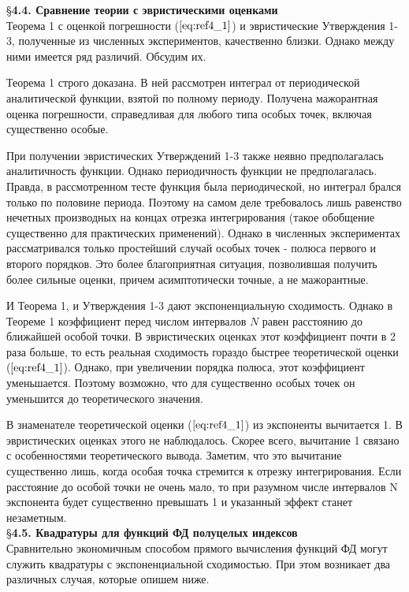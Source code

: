\S \textbf{4.4. Сравнение теории с эвристическими оценками}
\\

Теорема 1 с оценкой погрешности ($\ref{eq:ref4_1}$) и эвристические Утверждения 1-3, полученные из численных экспериментов, качественно близки. Однако между ними имеется ряд различий. Обсудим их.

Теорема 1 строго доказана. В ней рассмотрен интеграл от периодической аналитической функции, взятой по полному периоду. Получена мажорантная оценка погрешности, справедливая для любого типа особых точек, включая существенно особые.

При получении эвристических Утверждений 1-3 также неявно предполагалась аналитичность функции. Однако периодичность функции не предполагалась. Правда, в рассмотренном тесте функция была периодической, но интеграл брался только по половине периода. Поэтому на самом деле требовалось лишь равенство нечетных производных на концах отрезка интегрирования (такое обобщение существенно для практических применений). Однако в численных экспериментах рассматривался только простейший случай особых точек - полюса первого и второго порядков. Это более благоприятная ситуация, позволившая получить более сильные оценки, причем асимптотически точные, а не мажорантные.

И Теорема 1, и Утверждения 1-3 дают экспоненциальную сходимость. Однако в Теореме 1 коэффициент перед числом интервалов $N$ равен расстоянию до ближайшей особой точки. В эвристических оценках этот коэффициент почти в 2 раза больше, то есть реальная сходимость гораздо быстрее теоретической оценки ($\ref{eq:ref4_1}$). Однако, при увеличении порядка полюса, этот коэффициент уменьшается. Поэтому возможно, что для существенно особых точек он уменьшится до теоретического значения.

В знаменателе теоретической оценки ($\ref{eq:ref4_1}$) из экспоненты вычитается 1. В эвристических оценках этого не наблюдалось. Скорее всего, вычитание 1 связано с особенностями теоретического вывода. Заметим, что это вычитание существенно лишь, когда особая точка стремится к отрезку интегрирования. Если расстояние до особой точки не очень мало, то при разумном числе интервалов N экспонента будет существенно превышать 1 и указанный эффект станет незаметным.
\\

\S \textbf{4.5. Квадратуры для функций ФД полуцелых индексов}
\\

Сравнительно экономичным способом прямого вычисления функций ФД могут служить квадратуры с
экспоненциальной сходимостью. При этом возникает два различных случая,
которые опишем ниже.

